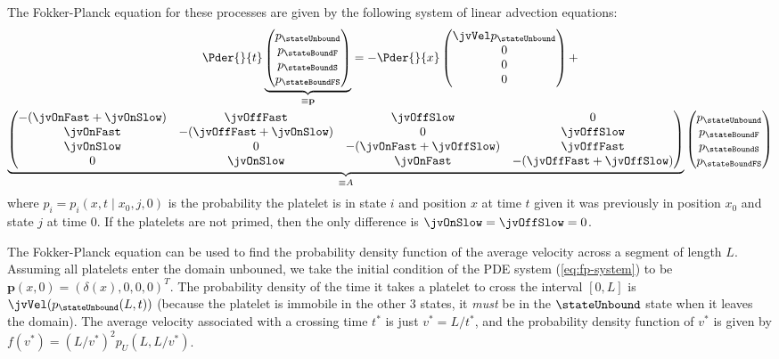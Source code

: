 The Fokker-Planck equation for these processes are given by the
following system of linear advection equations:
\begin{multline}
  \label{eq:fp-system}
  \Pder{}{t}
  \underbrace{
    \begin{pmatrix}
      p_{\stateUnbound} \\  p_\stateBoundF \\ p_\stateBoundS \\
      p_\stateBoundFS
    \end{pmatrix}}_{\equiv \mathbf{p}}
  =
  -\Pder{}{x}
  \begin{pmatrix}
    \jvVel p_{\stateUnbound} \\ 0 \\ 0 \\ 0
  \end{pmatrix}
  + \\
  \underbrace{
    \begin{pmatrix}
      -(\jvOnFast + \jvOnSlow) & \jvOffFast & \jvOffSlow & 0 \\
      \jvOnFast & -(\jvOffFast + \jvOnSlow) & 0 & \jvOffSlow \\
      \jvOnSlow & 0 & -(\jvOnFast + \jvOffSlow) & \jvOffFast \\
      0 & \jvOnSlow & \jvOnFast & -(\jvOffFast + \jvOffSlow)
  \end{pmatrix}}_{\equiv A}
  \begin{pmatrix}
    p_{\stateUnbound} \\ p_\stateBoundF \\ p_\stateBoundS \\
    p_\stateBoundFS
  \end{pmatrix}
\end{multline}
where $p_i = p_i(x, t \mid x_0, j, 0)$ is the probability the platelet
is in state $i$ and position $x$ at time $t$ given it was previously in
position $x_0$ and state $j$ at time $0$. If the platelets are not primed,
then the only difference is $\jvOnSlow = \jvOffSlow = 0$.

The Fokker-Planck equation can be used to find the probability density
function of the average velocity across a segment of length
$L$. Assuming all platelets enter the domain unbouned, we take the
initial condition of the PDE system (\ref{eq:fp-system}) to be
$\mathbf{p}(x, 0) = (\delta(x), 0, 0, 0)^T$. The probability density
of the time it takes a platelet to cross the interval $[0, L]$ is
$\jvVel (p_{\stateUnbound}(L,t))$ (because the platelet is immobile in
the other 3 states, it \emph{must} be in the $\stateUnbound$ state
when it leaves the domain). The average velocity associated with a
crossing time $t^*$ is just $v^* = L/t^*$, and the probability density
function of $v^*$ is given by $f(v^*) = (L/v^*)^2 p_U(L,
L/v^*)$. 

